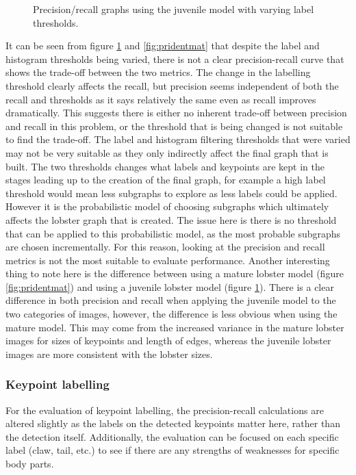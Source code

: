 \begin{figure}[H]
\centering
{}
\caption{Precision/recall graphs using the juvenile model with varying label thresholds.}
\label{fig:pridentjuv}
\end{figure}
\noindent
It can be seen from figure \ref{fig:pridentjuv} and \ref{fig:pridentmat} that despite the label and histogram thresholds being varied, there is not a clear precision-recall curve that shows the trade-off between the two metrics. The change in the labelling threshold clearly affects the recall, but precision seems independent of both the recall and thresholds as it says relatively the same even as recall improves dramatically. This suggests there is either no inherent trade-off between precision and recall in this problem, or the threshold that is being changed is not suitable to find the trade-off. 
\n
The label and histogram filtering thresholds that were varied may not be very suitable as they only indirectly affect the final graph that is built. The two thresholds changes what labels and keypoints are kept in the stages leading up to the creation of the final graph, for example a high label threshold would mean less subgraphs to explore as less labels could be applied. However it is the probabilistic model of choosing subgraphs which ultimately affects the lobster graph that is created. The issue here is there is no threshold that can be applied to this probabilistic model, as the most probable subgraphs are chosen incrementally. For this reason, looking at the precision and recall metrics is not the most suitable to evaluate performance. 
\n
Another interesting thing to note here is the difference between using a mature lobster model (figure \ref{fig:pridentmat}) and using a juvenile lobster model (figure \ref{fig:pridentjuv}). There is a clear difference in both precision and recall when applying the juvenile model to the two categories of images, however, the difference is less obvious when using the mature model. This may come from the increased variance in the mature lobster images for sizes of keypoints and length of edges, whereas the juvenile lobster images are more consistent with the lobster sizes. 

\subsubsection{Keypoint labelling}
For the evaluation of keypoint labelling, the precision-recall calculations are altered slightly as the labels on the detected keypoints matter here, rather than the detection itself. Additionally, the evaluation can be focused on each specific label (claw, tail, etc.) to see if there are any strengths of weaknesses for specific body parts.

